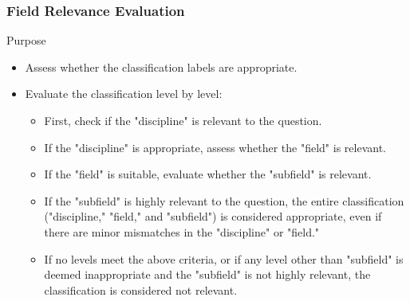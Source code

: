 \subsubsection{Field Relevance Evaluation}
\begin{purposebox}{Purpose}
\begin{itemize}
\item Assess whether the classification labels are appropriate.
\item Evaluate the classification level by level:
\begin{itemize}[label=\textbullet]
\item First, check if the "discipline" is relevant to the question.
\item If the "discipline" is appropriate, assess whether the "field" is relevant.
\item If the "field" is suitable, evaluate whether the "subfield" is relevant.
\item If the "subfield" is highly relevant to the question, the entire classification ("discipline," "field," and "subfield") is considered appropriate, even if there are minor mismatches in the "discipline" or "field."
\item If no levels meet the above criteria, or if any level other than "subfield" is deemed inappropriate and the "subfield" is not highly relevant, the classification is considered not relevant.
\end{itemize}
\end{itemize}
\end{purposebox}

